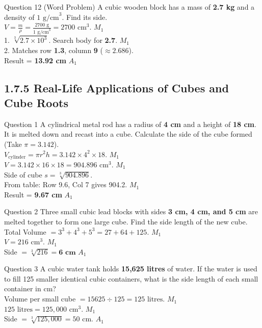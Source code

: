 \documentclass[12pt, a4paper, oneside]{article}
\begin{document}
\begin{solvingbox}{Question 12 (Word Problem)}
A cubic wooden block has a mass of \textbf{2.7 kg} and a density of \textbf{$1\text{ g/cm}^3$}. Find its side. \\
$V = \frac{m}{\rho} = \frac{2700\text{ g}}{1\text{ g/cm}^3} = 2700\text{ cm}^3$. \hfill $M_1$ \\
1. $\sqrt[3]{2.7 \times 10^3}$. Search body for \textbf{2.7}. \hfill $M_1$ \\
2. Matches row \textbf{1.3}, column \textbf{9} ($\approx 2.686$). \\
Result = \textbf{13.92 cm} \hfill $A_1$
\end{solvingbox}

\newpage

\subsection*{1.7.5 Real-Life Applications of Cubes and Cube Roots}

\begin{solvingbox}{Question 1}
A cylindrical metal rod has a radius of \textbf{4 cm} and a height of \textbf{18 cm}. It is melted down and recast into a cube. Calculate the side of the cube formed (Take $\pi = 3.142$). \\
$V_{\text{cylinder}} = \pi r^2 h = 3.142 \times 4^2 \times 18$. \hfill $M_1$ \\
$V = 3.142 \times 16 \times 18 = 904.896\text{ cm}^3$. \hfill $M_1$ \\
Side of cube $s = \sqrt[3]{904.896}$. \\
From table: Row 9.6, Col 7 gives 904.2. \hfill $M_1$ \\
Result = \textbf{9.67 cm} \hfill $A_1$
\end{solvingbox}

\begin{solvingbox}{Question 2}
Three small cubic lead blocks with sides \textbf{3 cm, 4 cm, and 5 cm} are melted together to form one large cube. Find the side length of the new cube. \\
Total Volume $= 3^3 + 4^3 + 5^3 = 27 + 64 + 125$. \hfill $M_1$ \\
$V = 216\text{ cm}^3$. \hfill $M_1$ \\
Side $= \sqrt[3]{216} = \mathbf{6\text{ cm}}$ \hfill $A_1$
\end{solvingbox}

\begin{solvingbox}{Question 3}
A cubic water tank holds \textbf{15,625 litres} of water. If the water is used to fill 125 smaller identical cubic containers, what is the side length of each small container in cm? \\
Volume per small cube $= 15625 \div 125 = 125\text{ litres}$. \hfill $M_1$ \\
$125\text{ litres} = 125,000\text{ cm}^3$. \hfill $M_1$ \\
Side $= \sqrt[3]{125,000} = 50\text{ cm}$. \hfill $A_1$
\end{solvingbox}
\end{document}
